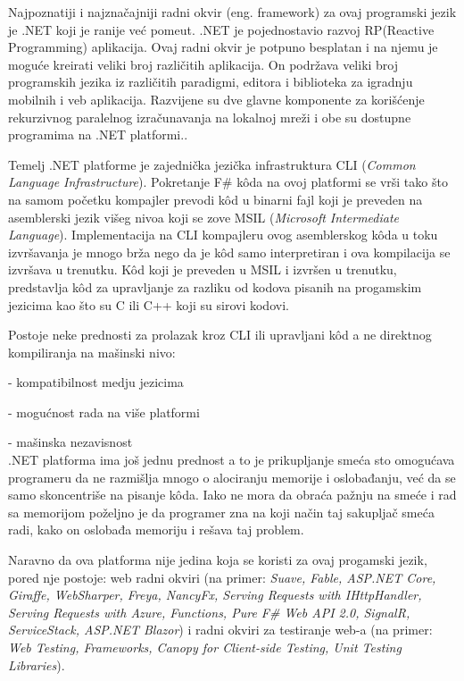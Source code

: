 \documentclass[a4paper]{article}
\begin{document}
Najpoznatiji i najznačajniji radni okvir (eng. framework) za ovaj programski jezik je .NET koji je ranije već pomeut. .NET je pojednostavio razvoj RP(Reactive Programming)\cite{RPapp} aplikacija. Ovaj radni okvir je potpuno besplatan i na njemu je moguće kreirati veliki broj različitih aplikacija. On podržava veliki broj programskih jezika iz različitih paradigmi, editora i biblioteka za igradnju mobilnih i veb aplikacija. Razvijene su dve glavne komponente za korišćenje rekurzivnog paralelnog izračunavanja na lokalnoj mreži i obe su dostupne programima na .NET platformi.\cite{ppNETframework}. 

Temelj .NET platforme je zajednička jezička infrastruktura CLI ({\em Common Language Infrastructure})\cite{cli}. Pokretanje F\# kôda na ovoj platformi se vrši tako što na samom početku kompajler prevodi kôd u binarni fajl koji je preveden na asemblerski jezik višeg nivoa koji se zove MSIL ({\em Microsoft Intermediate Language})\cite{msil}. Implementacija na CLI kompajleru ovog asemblerskog kôda u toku izvršavanja je mnogo brža nego da je kôd samo interpretiran i ova kompilacija se izvršava u trenutku\cite{progFs}.
Kôd koji je preveden u MSIL i izvršen u trenutku, predstavlja kôd za upravljanje za razliku od kodova pisanih na progamskim jezicima kao što su C ili C++ koji su sirovi kodovi.   

Postoje neke prednosti za prolazak kroz CLI ili upravljani kôd a ne direktnog kompiliranja na mašinski nivo:	

	- kompatibilnost medju jezicima
	
	- mogućnost rada na više platformi
	
	- mašinska nezavisnost
\\

.NET platforma ima još jednu prednost a to je prikupljanje smeća sto omogućava programeru da ne razmišlja mnogo o alociranju memorije i oslobađanju, već da se samo skoncentriše na pisanje kôda. Iako ne mora da obraća pažnju na smeće i rad sa memorijom poželjno je da programer zna na koji način taj sakupljač smeća radi, kako on oslobađa memoriju i rešava taj problem.

Naravno da ova platforma nije jedina koja se koristi za ovaj progamski jezik, pored nje postoje: web radni okviri (na primer: {\em Suave, Fable, ASP.NET Core, Giraffe, WebSharper, Freya, NancyFx, Serving Requests with IHttpHandler, Serving Requests with Azure, Functions, Pure F\# Web API 2.0, SignalR, ServiceStack, ASP.NET Blazor}) i radni okviri za testiranje web-a (na primer: {\em Web Testing, Frameworks, Canopy for Client-side Testing, Unit Testing Libraries})\cite{fwFs}.
\end{document}
